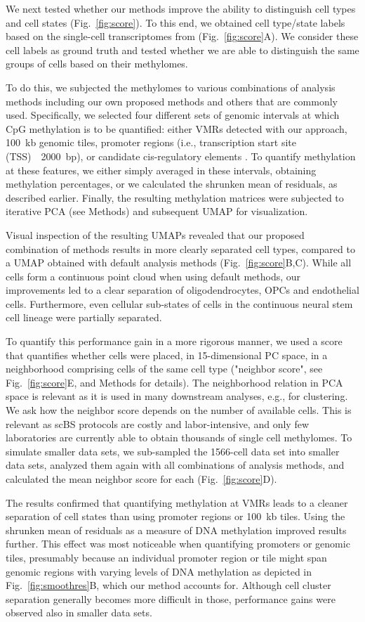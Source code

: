 \documentclass[twocolumn,10pt]{article}
\newcommand{\new}[1]{#1} %
\begin{document}
We next tested whether our methods improve the ability to distinguish cell types and cell states (Fig.~\ref{fig:score}).
To this end, we obtained cell type/state labels based on the single-cell transcriptomes from \citet{kremer_scnmt} (Fig.~\ref{fig:score}A).
We consider these cell labels as ground truth and tested whether we are able to distinguish the same groups of cells based on their methylomes.
\new{
To do this, we subjected the methylomes to various combinations of analysis methods including our own proposed methods and others that are commonly used.
Specifically, we selected four different sets of genomic intervals at which CpG methylation is to be quantified:
either VMRs detected with our approach, 100~kb genomic tiles, promoter regions (i.e., transcription start site (TSS)~\textpm~2000~bp), or candidate cis-regulatory elements \citep[ENCODE cCREs,][]{encode2020expanded}.
To quantify methylation at these features, we either simply averaged in these intervals, obtaining methylation percentages, or we calculated the shrunken mean of residuals, as described earlier.
Finally, the resulting methylation matrices were subjected to iterative PCA (see Methods) and subsequent UMAP for visualization.
}

Visual inspection of the resulting UMAPs revealed that our proposed combination of methods results in more clearly separated cell types, compared to a UMAP obtained with default analysis methods (Fig.~\ref{fig:score}B,C).
While all cells form a continuous point cloud when using default methods, our improvements led to a clear separation of oligodendrocytes, OPCs and endothelial cells.
Furthermore, even cellular sub-states of cells in the continuous neural stem cell lineage were partially separated.

To quantify this performance gain in a more rigorous manner, we used a score that quantifies whether cells were placed, in 15-dimensional PC space, in a neighborhood comprising cells of the same cell type ("neighbor score", see Fig.~\ref{fig:score}E, and Methods for details). \new{The neighborhood relation in PCA space is relevant as it is used in many downstream analyses, e.g., for clustering.}
We ask how the neighbor score depends on the number of available cells.
This is relevant as scBS protocols are costly and labor-intensive, and only few laboratories are currently able to obtain thousands of single cell methylomes.
To simulate smaller data sets, we sub-sampled the 1566-cell data set into smaller data sets, analyzed them again with all combinations of analysis methods, and calculated the mean neighbor score for each (Fig.~\ref{fig:score}D).
\new{
The results confirmed that quantifying methylation at VMRs leads to a cleaner separation of cell states than using promoter regions or 100~kb tiles.
Using the shrunken mean of residuals as a measure of DNA methylation improved results further.
This effect was most noticeable when quantifying promoters or genomic tiles, presumably because an individual promoter region or tile might span genomic regions with varying levels of DNA methylation as depicted in Fig.~\ref{fig:smoothres}B, which our method accounts for.
Although cell cluster separation generally becomes more difficult in those, performance gains were observed also in smaller data sets.
}
\end{document}
